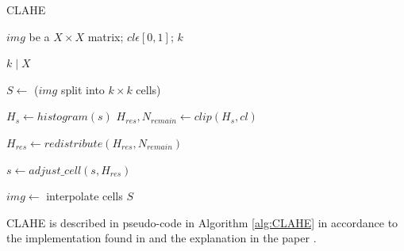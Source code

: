 \begin{algorithm}[h]
    \caption{CLAHE}\label{alg:CLAHE}
    \begin{algorithmic}[1]
        \Require $img$ be a $X\times X$ matrix; $cl \epsilon [0, 1]$; $k$

        \Ensure $k \mid X$

        \State $S \gets $ ($img$ split into $k\times k$ cells)

            \State $H_s \gets histogram(s)$
            \State $H_{res}, N_{remain} \gets clip(H_s, cl)$

            \State $H_{res} \gets redistribute(H_{res}, N_{remain})$

            \State $s \gets adjust\_cell(s, H_{res})$
        \EndFor

        \State $img \gets$ interpolate cells $S$

    \end{algorithmic}
\end{algorithm}

CLAHE is described in pseudo-code in Algorithm \ref{alg:CLAHE} in accordance to the implementation found in \cite{site:CLAHE_code} and the explanation in the paper \cite{article:CLAHE_explanation}.

